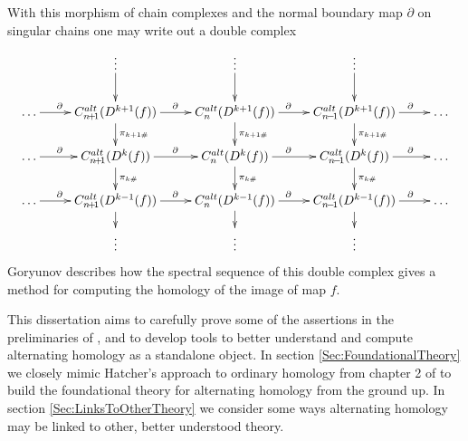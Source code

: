\documentclass[11pt,a4paper,twoside]{article}
\theoremstyle{plain}
\theoremstyle{definition}
\theoremstyle{definition}
\theoremstyle{definition}
\theoremstyle{definition}
\theoremstyle{definition}
\DeclareMathOperator{\sgn}{sgn}
\DeclareMathOperator{\coloneqq}{\vcentcolon=}
\begin{document}
With this morphism of chain complexes and the normal boundary map $\partial$ on singular chains one may write out a double complex
\begin{displaymath}
\xymatrix@R=0.6cm{
& \vdots \ar[d] & \vdots \ar[d] & \vdots \ar[d] & \\
\dots \ar[r]^{\partial\quad\quad} & C_{n\!+\!1}^{alt}(D^{k+1}(f)) \ar[r]^\partial \ar[d]^{\pi_{k+1\#}}  & C_{n}^{alt}(D^{k+1}(f)) \ar[r]^{\partial\quad} \ar[d]^{\pi_{k+1\#}}  & C_{n\!-\!1}^{alt}(D^{k+1}(f)) \ar[r]^{\quad\quad\partial} \ar[d]^{\pi_{k+1\#}}  & \dots \\
\dots \ar[r]^{\partial\quad\quad} & C_{n\!+\!1}^{alt}(D^{k}(f)) \ar[r]^\partial \ar[d]^{\pi_{k\#}}  & C_{n}^{alt}(D^{k}(f)) \ar[r]^{\partial\quad} \ar[d]^{\pi_{k\#}}  & C_{n\!-\!1}^{alt}(D^{k}(f)) \ar[r]^{\quad\quad\partial} \ar[d]^{\pi_{k\#}}  & \dots \\
\dots \ar[r]^{\partial\quad\quad} & C_{n\!+\!1}^{alt}(D^{k-1}(f)) \ar[r]^\partial \ar[d]  & C_{n}^{alt}(D^{k-1}(f)) \ar[r]^{\partial\quad} \ar[d] & C_{n\!-\!1}^{alt}(D^{k-1}(f)) \ar[r]^{\quad\quad\partial} \ar[d] & \dots \\
& \vdots & \vdots & \vdots &
}
\end{displaymath}
Goryunov describes how the spectral sequence of this double complex gives a method for computing the homology of the image of map $f$.

This dissertation aims to carefully prove some of the assertions in the preliminaries of \cite{HoustonTopology}, and to develop tools to better understand and compute alternating homology as a standalone object. In section \ref{Sec:FoundationalTheory} we closely mimic Hatcher's approach to ordinary homology from chapter 2 of \cite{algebraictopology} to build the foundational theory for alternating homology from the ground up. In section \ref{Sec:LinksToOtherTheory} we consider some ways alternating homology may be linked to other, better understood theory.
\end{document}

